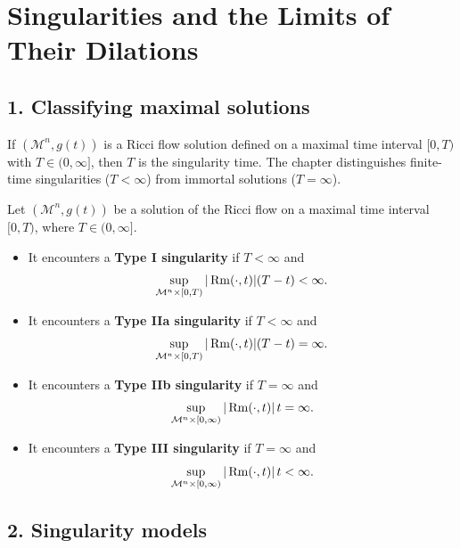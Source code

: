 \chapter{Singularities and the Limits of Their Dilations}

\section*{1. Classifying maximal solutions}

\begin{remark}
\label{ch08-rem-singularity-time-maximal-solutions}
If \((\mathcal M^n,g(t))\) is a Ricci flow solution defined on a maximal time interval \([0,T)\) with \(T\in(0,\infty]\), then \(T\) is the singularity time. The chapter distinguishes finite-time singularities (\(T<\infty\)) from immortal solutions (\(T=\infty\)).
\end{remark}

\begin{definition}
\label{ch08-def-singularity-types}
Let \((\mathcal M^n,g(t))\) be a solution of the Ricci flow on a maximal time interval \( [0,T)\), where \(T\in(0,\infty]\).
\begin{itemize}
\item It encounters a \textbf{Type I singularity} if \(T<\infty\) and
\[
\sup_{\mathcal M^n\times[0,T)} |\operatorname{Rm}(\cdot,t)|(T-t)<\infty.
\]
\item It encounters a \textbf{Type IIa singularity} if \(T<\infty\) and
\[
\sup_{\mathcal M^n\times[0,T)} |\operatorname{Rm}(\cdot,t)|(T-t)=\infty.
\]
\item It encounters a \textbf{Type IIb singularity} if \(T=\infty\) and
\[
\sup_{\mathcal M^n\times[0,\infty)} |\operatorname{Rm}(\cdot,t)|\,t=\infty.
\]
\item It encounters a \textbf{Type III singularity} if \(T=\infty\) and
\[
\sup_{\mathcal M^n\times[0,\infty)} |\operatorname{Rm}(\cdot,t)|\,t<\infty.
\]
\end{itemize}
\end{definition}

\section*{2. Singularity models}

